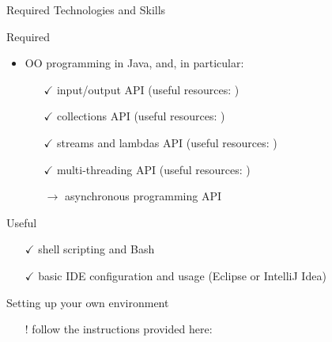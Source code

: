 \documentclass[presentation]{beamer}\mode<presentation>{\usetheme{AMSBolognaFC}}
\begin{document}
\begin{frame}[c,allowframebreaks]{Required Technologies and Skills}
\begin{alertblock}{Required}
\begin{itemize}
            \vfill

            \item OO programming in Java, and, in particular:
            \begin{itemize}
                \item[$\checkmark$] input/output API (useful resources: \cite{ProgrammizJavaIO})
                \item[$\checkmark$] collections API (useful resources: \cite{Naftalin2006, Bloch2008, JavaCollectionsCheatsheets})
                \item[$\checkmark$] streams and lambdas API (useful resources: \cite{Warburton2014, Bloch2008})
                \item[$\checkmark$] multi-threading API (useful resources: \cite{Lea1999, Oaks2004, Garg2004, Goetz2006})
                \item[$\rightarrow$] asynchronous programming API
            \end{itemize}

        \end{itemize}
    \end{alertblock}

    \begin{exampleblock}{Useful}
        \begin{itemize}
            \item[$\checkmark$] shell scripting and \alert{Bash}
            \item[$\checkmark$] basic IDE configuration and usage (\alert{Eclipse} or \alert{IntelliJ Idea})
        \end{itemize}
    \end{exampleblock}

    \begin{alertblock}{Setting up your own environment}
        \begin{itemize}
            \item[!] follow the instructions provided here: \cite{envSetup}
        \end{itemize}
    \end{alertblock}

\end{frame}
\end{document}
